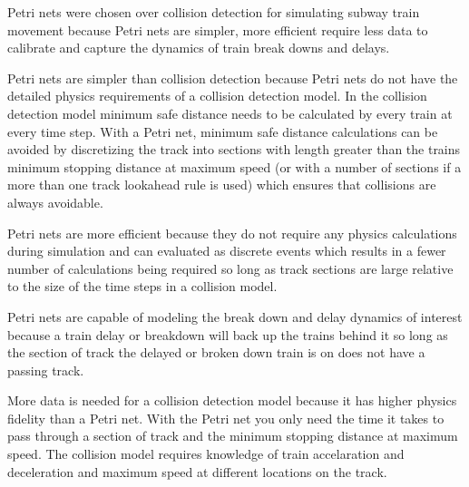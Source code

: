 Petri nets were chosen over collision detection for simulating subway train
movement because Petri nets are simpler, more efficient require less data to
calibrate and capture the dynamics of train break downs and delays. 

Petri nets are simpler than collision detection because Petri nets do not have
the detailed physics requirements of a collision detection model. In the
collision detection model minimum safe distance needs to be calculated by every
train at every time step. With a Petri net, minimum safe distance calculations
can be avoided by discretizing the track into sections with length greater than
the trains minimum stopping distance at maximum speed (or with a number of
sections if a more than one track lookahead rule is used) which ensures that
collisions are always avoidable. 

Petri nets are more efficient because they do not require any physics
calculations during simulation and can evaluated as discrete events which
results in a fewer number of calculations being required so long as track
sections are large relative to the size of the time steps in a collision model.

Petri nets are capable of modeling the break down and delay dynamics of interest
because a train delay or breakdown will back up the trains behind it so long as
the section of track the delayed or broken down train is on does not have a
passing track. 

More data is needed for a collision detection model because it has higher
physics fidelity than a Petri net. With the Petri net you only need the time it
takes to pass through a section of track and the minimum stopping distance at
maximum speed. The collision model requires knowledge of train accelaration and
deceleration and maximum speed at different locations on the track.
